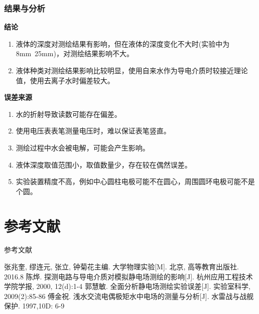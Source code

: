 \documentclass{beamer}
\begin{document}
    \begin{frame}
        \frametitle{结果与分析}
        \textbf{结论}
        \begin{enumerate}
            \item 液体的深度对测绘结果有影响，但在液体的深度变化不大时(实验中为8mm~25mm)，对测绘结果影响不大。
            \item 液体种类对测绘结果影响比较明显，使用自来水作为导电介质时较接近理论值，使用去离子水时偏差较大。
        \end{enumerate}
        
        \quad

        \textbf{误差来源}
        \begin{enumerate}
            \item 水的折射导致读数可能存在偏差。
            \item 使用电压表表笔测量电压时，难以保证表笔竖直。
            \item 测绘过程中水会被电解，可能会产生影响。
            \item 液体深度取值范围小，取值数量少，存在较在偶然误差。
            \item 实验装置精度不高，例如中心圆柱电极可能不在圆心，周围圆环电极可能不是个圆。
        \end{enumerate}
        
    
    \end{frame}

    \section{参考文献}

    \begin{frame}{参考文献}
        \begin{thebibliography}{99}  
            张兆奎, 缪连元, 张立, 钟菊花主编. 大学物理实验[M]. 北京, 高等教育出版社. 2016.8
            陈烨. 探测电路与导电介质对模拟静电场测绘的影响[J]. 杭州应用工程技术学院学报, 2000, 12(d):1-4
            郭慧敏. 全面分析静电场测绘实验误差[J]. 实验室科学, 2009(2):85-86
            傅金祝. 浅水交流电偶极矩水中电场的测量与分析[J]. 水雷战与战舰保护. 1997,10D: 6-9 
            \end{thebibliography}
    \end{frame}
\end{document}
